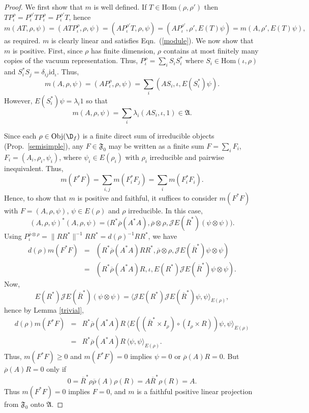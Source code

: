 \documentclass[12pt]{article}
\newcommand{\alg}[1]{\mathfrak{#1}}
\newcommand{\norm}[1]{\| #1\|}
\theoremstyle{definition}
\theoremstyle{definition}
\theoremstyle{remark}
\newcommand{\Obj}{\mathrm{Obj}}
\def\2#1{{\mathcal #1}}
\def\ol#1{{\overline #1}}
\newcommand{\Hom}{\mathrm{Hom}}
\def\id{\mathrm{id}}
\begin{document}
\begin{proof} We first show that $m$ is well defined.  If $T\in \Hom (\rho ,\rho ')$
  then $TP_{\iota}^{\rho}=P_{\iota}^{\rho '}TP_{\iota}^{\rho}=P_{\iota}^{\rho'}T$,
  hence
$$ m(AT,\rho ,\psi )=(ATP_{\iota}^{\rho},\rho ,\psi )=(AP_{\iota}^{\rho '}T,\rho ,\psi )=(AP_{\iota}^{\rho'},\rho ',E(T)\psi
)=m(A,\rho ',E(T)\psi ) ,$$ as required.  $m$ is clearly linear and satisfies Eqn.\
(\ref{module}).  We now show that $m$ is positive.  First, since $\rho$ has finite
dimension, $\rho$ contains at most finitely many copies of the vacuum representation.
Thus, $P_{\iota}^{\rho}=\sum _iS_iS_i^*$ where $S_i\in \Hom (\iota ,\rho )$ and
$S_i^*S_j=\delta _{ij}\id _\iota $.  Thus,
$$ m(A,\rho ,\psi )=(AP_{\iota}^{\rho},\rho ,\psi )=\sum _i(AS_i,\iota ,E(S_i^*)\psi) .$$
However, $E(S_i^*)\psi =\lambda _i1$ so that
$$ m(A,\rho ,\psi )=\sum _i\lambda _i(AS_i,\iota ,1) \in \alg{A} .$$

Since each $\rho \in \Obj (\D _f )$ is a finite direct sum of irreducible objects
(Prop.\ \ref{semisimple}), any $F\in \alg{F}_0 $ may be written as a finite sum
$F=\sum _iF_i$, $F_i=(A_i,\rho _i,\psi _i)$, where $\psi _i\in E(\rho _i)$ with $\rho
_i$ irreducible and pairwise inequivalent.  Thus,
$$ m(F^*F)= \sum _{i,j}m(F_i^*F_j)=\sum _im(F_i^*F_i) .$$
Hence, to show that $m$ is positive and faithful, it suffices to consider $m(F^*F)$
with $F=(A,\rho ,\psi )$, $\psi \in E(\rho)$ and $\rho$ irreducible.  In this case,
$$ (A,\rho ,\psi )^*(A,\rho ,\psi )=\bigl( R^*\ol\rho (A^*A),\ol\rho \otimes \rho ,\2JE(\ol R^*)(\psi \otimes \psi )\bigr).$$
Using $P^{\ol\rho \otimes \rho }_{\iota}=\norm{RR^*}^{-1}RR^*=d(\rho )^{-1}RR^*$, we
have
\begin{eqnarray*} d(\rho )m(F^*F) &=& (R^*\ol\rho (A^*A)RR^*,\ol\rho \otimes \rho
  ,\2JE(\ol R^*)\psi \otimes \psi ) \\
  &=& (R^*\ol\rho (A^*A)R,\iota ,E(R^*)\2JE(\ol R^*)\psi \otimes \psi )
  .\end{eqnarray*} Now,
$$ E(R^*)\2JE(\ol R^*)(\psi \otimes \psi)=\bigl\langle \2JE(R^*)\2JE(\ol R^*)\psi
,\psi \bigr\rangle _{E(\rho )} ,$$ hence by Lemma \ref{trivial},
\begin{eqnarray*} d(\rho )m(F^*F) &=& R^*\ol \rho (A^*A)R \, \bigl\langle E((\ol
  R^*\times I _{\rho})\circ
  (I_{\rho}\times R))\psi ,\psi \bigr\rangle _{E(\rho )} \\
  &=& R^*\ol \rho (A^*A)R \,\bigl\langle \psi ,\psi \bigr\rangle _{E(\rho )}
  .\end{eqnarray*} Thus, $m(F^*F)\geq 0$ and $m(F^*F)=0$ implies $\psi =0$ or $\ol
\rho (A)R=0$.  But $\ol \rho (A)R=0$ only if
$$ 0=\ol R^*\rho \ol \rho (A)\rho (R) = A\ol R^*\rho (R) = A.$$
Thus $m(F^*F)=0$ implies $F=0$, and $m$ is a faithful positive linear projection from
$\alg{F}_0 $ onto $\alg{A}$.  \end{proof}
\end{document}
